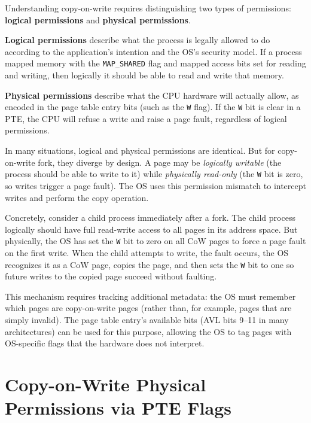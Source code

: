 \documentclass[11pt]{article}
\begin{document}
Understanding copy-on-write requires distinguishing two types of permissions: \textbf{logical permissions} and \textbf{physical permissions}.

\textbf{Logical permissions} describe what the process is legally allowed to do according to the application's intention and the OS's security model. If a process mapped memory with the \texttt{MAP\_SHARED} flag and mapped access bits set for reading and writing, then logically it should be able to read and write that memory.

\textbf{Physical permissions} describe what the CPU hardware will actually allow, as encoded in the page table entry bits (such as the \texttt{W} flag). If the \texttt{W} bit is clear in a PTE, the CPU will refuse a write and raise a page fault, regardless of logical permissions.

In many situations, logical and physical permissions are identical. But for copy-on-write fork, they diverge by design. A page may be \emph{logically writable} (the process should be able to write to it) while \emph{physically read-only} (the \texttt{W} bit is zero, so writes trigger a page fault). The OS uses this permission mismatch to intercept writes and perform the copy operation.

Concretely, consider a child process immediately after a fork. The child process logically should have full read-write access to all pages in its address space. But physically, the OS has set the \texttt{W} bit to zero on all CoW pages to force a page fault on the first write. When the child attempts to write, the fault occurs, the OS recognizes it as a CoW page, copies the page, and then sets the \texttt{W} bit to one so future writes to the copied page succeed without faulting.

This mechanism requires tracking additional metadata: the OS must remember which pages are copy-on-write pages (rather than, for example, pages that are simply invalid). The page table entry's available bits (AVL bits 9--11 in many architectures) can be used for this purpose, allowing the OS to tag pages with OS-specific flags that the hardware does not interpret.

\section{Copy-on-Write Physical Permissions via PTE Flags}
\end{document}
